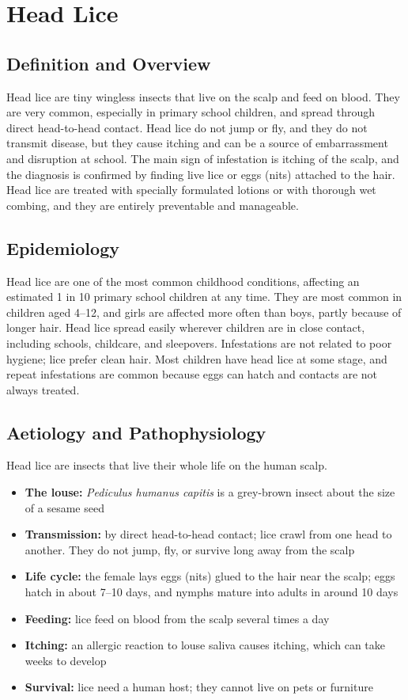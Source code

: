\chapter{Head Lice}

\section*{Definition and Overview}
Head lice are tiny wingless insects that live on the scalp and feed on blood. They are very common, especially in primary school children, and spread through direct head-to-head contact. Head lice do not jump or fly, and they do not transmit disease, but they cause itching and can be a source of embarrassment and disruption at school. The main sign of infestation is itching of the scalp, and the diagnosis is confirmed by finding live lice or eggs (nits) attached to the hair. Head lice are treated with specially formulated lotions or with thorough wet combing, and they are entirely preventable and manageable.

\section*{Epidemiology}
Head lice are one of the most common childhood conditions, affecting an estimated 1 in 10 primary school children at any time. They are most common in children aged 4--12, and girls are affected more often than boys, partly because of longer hair. Head lice spread easily wherever children are in close contact, including schools, childcare, and sleepovers. Infestations are not related to poor hygiene; lice prefer clean hair. Most children have head lice at some stage, and repeat infestations are common because eggs can hatch and contacts are not always treated.

\section*{Aetiology and Pathophysiology}
Head lice are insects that live their whole life on the human scalp.

\begin{itemize}
    \item \textbf{The louse:} \textit{Pediculus humanus capitis} is a grey-brown insect about the size of a sesame seed
    \item \textbf{Transmission:} by direct head-to-head contact; lice crawl from one head to another. They do not jump, fly, or survive long away from the scalp
    \item \textbf{Life cycle:} the female lays eggs (nits) glued to the hair near the scalp; eggs hatch in about 7--10 days, and nymphs mature into adults in around 10 days
    \item \textbf{Feeding:} lice feed on blood from the scalp several times a day
    \item \textbf{Itching:} an allergic reaction to louse saliva causes itching, which can take weeks to develop
    \item \textbf{Survival:} lice need a human host; they cannot live on pets or furniture
\end{itemize}

